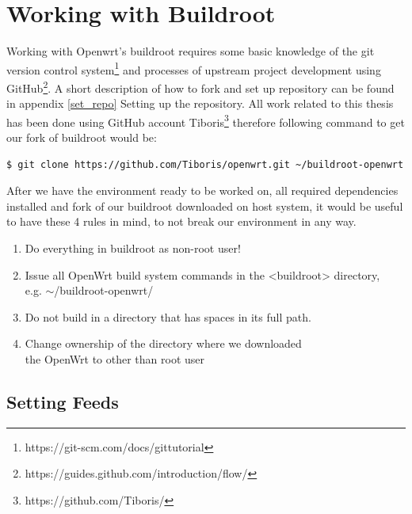 \section{Working with Buildroot}\label{working-with-buildroot}

Working with Openwrt's buildroot requires some basic knowledge of the git version control system\footnote{https://git-scm.com/docs/gittutorial} and processes of upstream project development using GitHub\footnote{https://guides.github.com/introduction/flow/}.
A short description of how to fork and set up repository can be found in appendix \ref{set_repo} Setting up the repository.
All work related to this thesis has been done using GitHub account Tiboris\footnote{https://github.com/Tiboris/} therefore following command to get our fork of buildroot would be:
\begin{lstlisting}[columns=fixed,basicstyle=\ttfamily\footnotesize,tabsize=4,backgroundcolor=\color{yellow!10}]
$ git clone https://github.com/Tiboris/openwrt.git ~/buildroot-openwrt
\end{lstlisting}

After we have the environment ready to be worked on, all required dependencies installed and fork of our buildroot downloaded on host system, it would be useful to have these 4 rules in mind, to not break our environment in any way.
\begin{enumerate}
    \item Do everything in buildroot as non-root user!
    \item Issue all OpenWrt build system commands in the <buildroot> directory, \\e.g. $\sim$/buildroot-openwrt/
    \item Do not build in a directory that has spaces in its full path.
    \item Change ownership of the directory where we downloaded \\the OpenWrt to other than root user
\end{enumerate}



\subsection{Setting Feeds}

